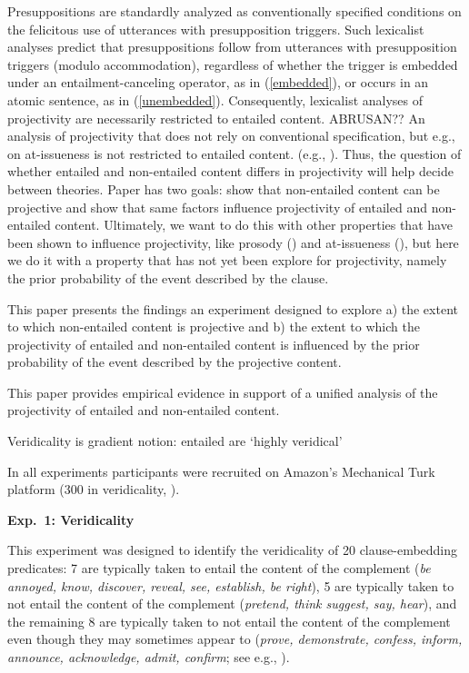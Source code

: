 \documentclass[12pt]{article}
\newcommand{\6}{\mbox{$[\hspace*{-.6mm}[$}}
\newcommand{\9}{\mbox{$]\hspace*{-.6mm}]$}}
\begin{document}
Presuppositions are standardly analyzed as conventionally specified conditions on the felicitous use of utterances with presupposition triggers. Such lexicalist analyses predict that presuppositions follow from utterances with presupposition triggers (modulo accommodation), regardless of whether the trigger is embedded under an entailment-canceling operator, as in (\ref{embedded}), or occurs in an atomic sentence, as in (\ref{unembedded}). Consequently, lexicalist analyses of projectivity are necessarily restricted to entailed content. ABRUSAN?? An analysis of projectivity that does not rely on conventional specification, but e.g., on at-issueness is not restricted to entailed content. (e.g., \citealt{brst-salt10,brst-ar,abrusan2011,abrusan2013}). Thus, the question of whether entailed and non-entailed content differs in projectivity will help decide between theories. Paper has two goals: show that non-entailed content can be projective and show that same factors influence projectivity of entailed and non-entailed content. Ultimately, we want to do this with other properties that have been shown to influence projectivity, like prosody (\citealt{cummins-rohde2015,tonhauser-salt26}) and at-issueness (\citealt{tbd-variability}), but here we do it with a property that has not yet been explore for projectivity, namely the prior probability of the event described by the clause.

This paper presents the findings an experiment designed to explore a) the extent to which non-entailed content is projective and b) the extent to which the projectivity of entailed and non-entailed content is influenced by the prior probability of the event described by the projective content. 

This paper provides empirical evidence in support of a unified analysis of the projectivity of entailed and non-entailed content.



Veridicality is gradient notion: entailed are `highly veridical'

In all experiments participants were recruited on Amazon's Mechanical Turk platform (300 in veridicality, ).

{\bf Exp.~1: Veridicality} 

This experiment was designed to identify the veridicality of 20 clause-embedding predicates: 7 are typically taken to entail the content of the complement ({\em be annoyed, know, discover, reveal, see, establish, be right}), 5 are typically taken to not entail the content of the complement ({\em pretend, think suggest, say, hear}), and the remaining 8 are typically taken to not entail the content of the complement even though they may sometimes appear to ({\em prove, demonstrate, confess, inform, announce, acknowledge, admit, confirm}; see e.g., \citealt{schlenker10,swanson2012,anand-hacquard2014}). 
\end{document}
